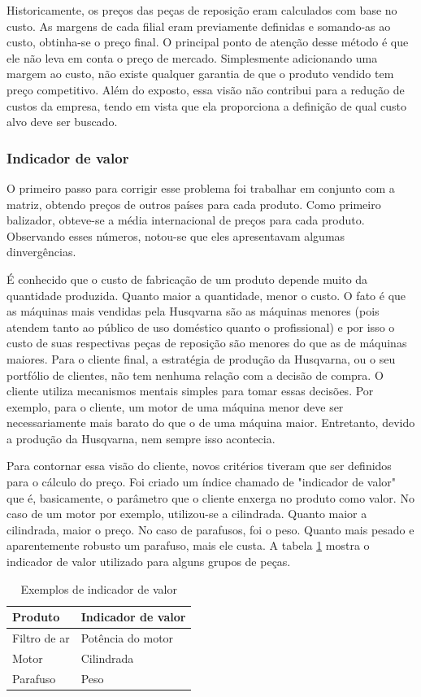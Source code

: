 \documentclass[12pt]{article}
\begin{document}
	Historicamente, os preços das peças de reposição eram calculados com base no custo. As margens de cada filial eram previamente definidas e somando-as ao custo, obtinha-se o preço final. O principal ponto de atenção desse método é que ele não leva em conta o preço de mercado. Simplesmente adicionando uma margem ao custo, não existe qualquer garantia de que o produto vendido tem preço competitivo. Além do exposto, essa visão não contribui para a redução de custos da empresa, tendo em vista que ela proporciona a definição de qual custo alvo deve ser buscado.

\subsubsection{Indicador de valor}

	O primeiro passo para corrigir esse problema foi trabalhar em conjunto com a matriz, obtendo preços de outros países para cada produto. Como primeiro balizador, obteve-se a média internacional de preços para cada produto. Observando esses números, notou-se que eles apresentavam algumas dinvergências.

	É conhecido que o custo de fabricação de um produto depende muito da quantidade produzida. Quanto maior a quantidade, menor o custo. O fato é que as máquinas mais vendidas pela Husqvarna são as máquinas menores (pois atendem tanto ao público de uso doméstico quanto o profissional) e por isso o custo de suas respectivas peças de reposição são menores do que as de máquinas maiores. Para o cliente final, a estratégia de produção da Husqvarna, ou o seu portfólio de clientes, não tem nenhuma relação com a decisão de compra. O cliente utiliza mecanismos mentais simples para tomar essas decisões. Por exemplo, para o cliente, um motor de uma máquina menor deve ser necessariamente mais barato do que o de uma máquina maior. Entretanto, devido a produção da Husqvarna, nem sempre isso acontecia.

	Para contornar essa visão do cliente, novos critérios tiveram que ser definidos para o cálculo do preço. Foi criado um índice chamado de "indicador de valor" que é, basicamente, o parâmetro que o cliente enxerga no produto como valor. No caso de um motor por exemplo, utilizou-se a cilindrada. Quanto maior a cilindrada, maior o preço. No caso de parafusos, foi o peso. Quanto mais pesado e aparentemente robusto um parafuso, mais ele custa. A tabela \ref{tab:valor} mostra o indicador de valor utilizado para alguns grupos de peças.

\begin{table}[!h]
	\centering
	\caption{Exemplos de indicador de valor}
	\begin{tabular}{| l | l |}
		\hline
		Produto & Indicador de valor \\ \hline
		Filtro de ar & Potência do motor \\
		Motor & Cilindrada \\
		Parafuso & Peso \\
		\hline
	\end{tabular}
	\label{tab:valor}
\end{table}
\end{document}
